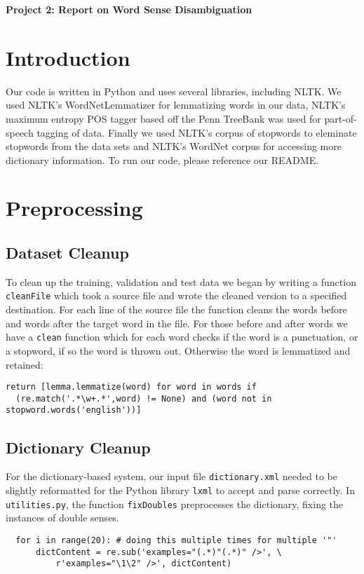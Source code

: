 \documentclass{article}
\begin{document}
\begin{center}\textbf{Project 2: Report on Word Sense Disambiguation}\end{center}

\section{Introduction}

Our code is written in Python and uses several libraries, including NLTK. We used NLTK's WordNetLemmatizer for lemmatizing words in our data, NLTK's maximum entropy POS tagger based off the Penn TreeBank was used for part-of-speech tagging of data. Finally we used NLTK's corpus of stopwords to eleminate stopwords from the data sets and NLTK's WordNet corpus for accessing more dictionary information. To run our code, please reference our README.

\section{Preprocessing}

\subsection{Dataset Cleanup}

To clean up the training, validation and test data we began by writing a function \texttt{cleanFile} which took a source file and wrote the cleaned version to a specified destination. For each line of the source file the function cleans the words before and words after the target word in the file. For those before and after words we have a \texttt{clean} function which for each word checks if the word is a punctuation, or a stopword, if so the word is thrown out. Otherwise the word is lemmatized and retained:
{\small
\begin{verbatim}
return [lemma.lemmatize(word) for word in words if
  (re.match('.*\w+.*',word) != None) and (word not in stopword.words('english'))]
\end{verbatim}
}

\subsection{Dictionary Cleanup}
For the dictionary-based system, our input file \texttt{dictionary.xml} needed to be slightly reformatted for the Python library \texttt{lxml} to accept and parse correctly. In \texttt{utilities.py}, the function \texttt{fixDoubles} preprocesses the dictionary, fixing the instances of double senses.
{\small\begin{verbatim}
  for i in range(20): # doing this multiple times for multiple '"'
      dictContent = re.sub('examples="(.*)"(.*)" />', \
          r'examples="\1\2" />', dictContent)
\end{verbatim}}
\end{document}
